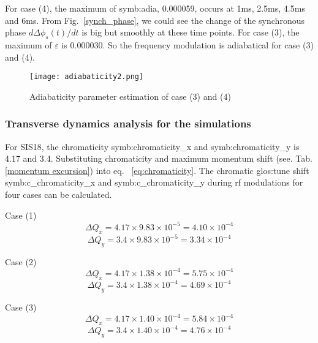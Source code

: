 \begin{itemize}
For case (4), the maximum of \gls{symb:adia}, 0.000059, occurs at 1ms, 2.5ms, 4.5ms and 6ms. From Fig.~\ref{synch_phase}, we could see the change of the synchronous phase $d\Delta \phi_s(t)/dt$  is big but smoothly at these time points. For case (3), the maximum of $\varepsilon$ is 0.000030. So the frequency modulation is adiabatical for case (3) and (4).


\begin{figure}[H]
   \centering   
   \texttt{[image: adiabaticity2.png]}
   \caption{Adiabaticity parameter estimation of case (3) and (4)}
   \label{adiabaticity2}
\end{figure}
\end{itemize}
\subsubsection{Transverse dynamics analysis for the simulations}
For SIS18, the chromaticity \gls{symb:chromaticity_x} and \gls{symb:chromaticity_y} is 4.17 and 3.4. Substituting chromaticity and maximum momentum shift (see. Tab. \ref{momentum excursion}) into eq. ~\ref{eq:chromaticity}. The chromatic \gls{glos:tune} shift \gls{symb:c_chromaticity_x} and \gls{symb:c_chromaticity_y} during rf modulations for four cases can be calculated. 

Case (1) 
\begin{equation}
\Delta Q_x = 4.17 \times 9.83 \times 10^{-5}=4.10 \times 10^{-4}
\end{equation}
\begin{equation}
\Delta Q_y = 3.4 \times 9.83 \times 10^{-5}=3.34 \times 10^{-4} 
\end{equation}

Case (2)
\begin{equation}
\Delta Q_x = 4.17 \times 1.38 \times 10^{-4}=5.75 \times 10^{-4}
\end{equation}
\begin{equation}
\Delta Q_y = 3.4 \times 1.38 \times 10^{-4}=4.69 \times 10^{-4} 
\end{equation}

Case (3)
\begin{equation}
\Delta Q_x = 4.17 \times 1.40 \times 10^{-4}=5.84 \times 10^{-4}
\end{equation}
\begin{equation}
\Delta Q_y = 3.4 \times 1.40 \times 10^{-4}=4.76 \times 10^{-4} 
\end{equation}


